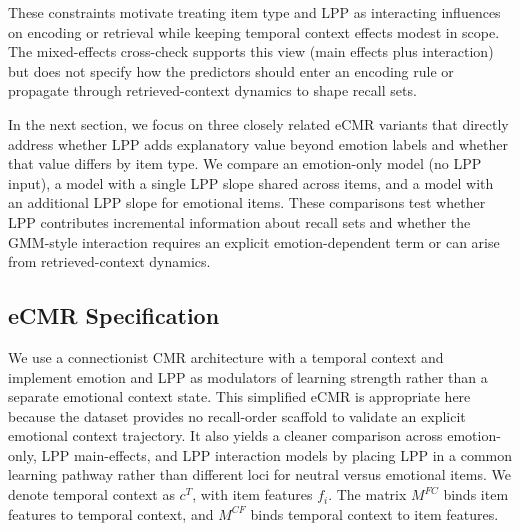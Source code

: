 \documentclass[
  man,
  longtable,
  nolmodern,
  notxfonts,
  notimes,
  draftfirst,
  colorlinks=true,linkcolor=blue,citecolor=blue,urlcolor=blue]{apa7}
\begin{document}
These constraints motivate treating item type and LPP as interacting
influences on encoding or retrieval while keeping temporal context
effects modest in scope. The mixed-effects cross-check supports this
view (main effects plus interaction) but does not specify how the
predictors should enter an encoding rule or propagate through
retrieved-context dynamics to shape recall sets.

In the next section, we focus on three closely related eCMR variants
that directly address whether LPP adds explanatory value beyond emotion
labels and whether that value differs by item type. We compare an
emotion-only model (no LPP input), a model with a single LPP slope
shared across items, and a model with an additional LPP slope for
emotional items. These comparisons test whether LPP contributes
incremental information about recall sets and whether the GMM-style
interaction requires an explicit emotion-dependent term or can arise
from retrieved-context dynamics.

\subsection{eCMR Specification}\label{ecmr-specification}

We use a connectionist CMR architecture with a temporal context and
implement emotion and LPP as modulators of learning strength rather than
a separate emotional context state. This simplified eCMR is appropriate
here because the dataset provides no recall-order scaffold to validate
an explicit emotional context trajectory. It also yields a cleaner
comparison across emotion-only, LPP main-effects, and LPP interaction
models by placing LPP in a common learning pathway rather than different
loci for neutral versus emotional items. We denote temporal context as
\(c^T\), with item features \(f_i\). The matrix \(M^{FC}\) binds item
features to temporal context, and \(M^{CF}\) binds temporal context to
item features.
\end{document}

